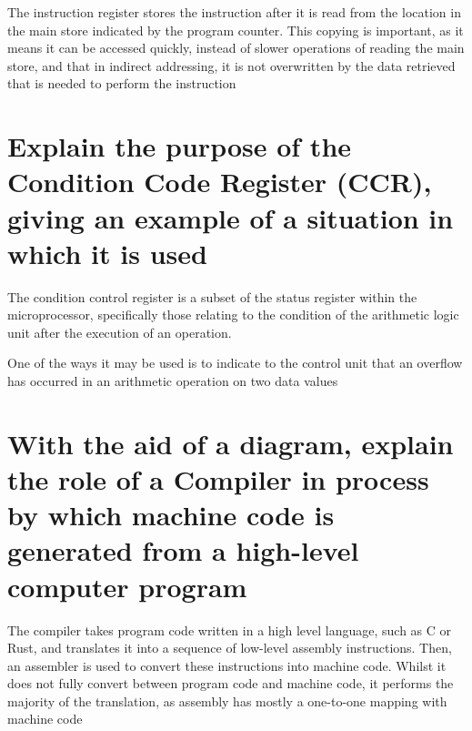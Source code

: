\documentclass{article}
\begin{document}
The instruction register stores the instruction after it is read from the
location in the main store indicated by the program counter. This copying is
important, as it means it can be accessed quickly, instead of slower operations
of reading the main store, and that in indirect addressing, it is not
overwritten by the data retrieved that is needed to perform the instruction



\section{Explain the purpose of the Condition Code Register (CCR), giving an
example of a situation in which it is used}

The condition control register is a subset of the status register within the
microprocessor, specifically those relating to the condition of the arithmetic
logic unit after the execution of an operation.

One of the ways it may be used is to indicate to the control unit that an
overflow has occurred in an arithmetic operation on two data values



\section{With the aid of a diagram, explain the role of a Compiler in process by
which machine code is generated from a high-level computer program}

The compiler takes program code written in a high level language, such as C or
Rust, and translates it into a sequence of low-level assembly instructions.
Then, an assembler is used to convert these instructions into machine code.
Whilst it does not fully convert between program code and machine code, it
performs the majority of the translation, as assembly has mostly a one-to-one
mapping with machine code
\end{document}

